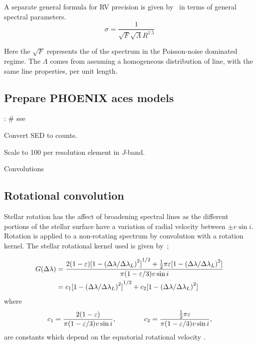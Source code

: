 A separate general formula for {RV} precision is given by~\citet{hatzes_spectrograph_1992} in terms of general spectral parameters.
\begin{equation}
\sigma = \frac{1}{\sqrt{F} \sqrt{\Lambda} {R}^{1.5}}
\end{equation}

Here the $\sqrt{F}$ represents the \snr{} of the spectrum in the {Poisson}-noise dominated regime.
The $\Lambda$ comes from assuming a homogeneous distribution of line, with the same line properties, per unit length.



\subsection{Prepare {PHOENIX} aces models}:
\# see~\citet{figueira_radial_2016}

Convert SED to counts.


Scale to 100 \snr{} per resolution element in \emph{J}-band.

Convolutions

\subsection{Rotational convolution}
\label{subsec:rotational_convolution}
Stellar rotation has the affect of broadening spectral lines as the different portions of the stellar surface have a variation of radial velocity between \(\pm v \sin i\).
Rotation is applied to a non-rotating spectrum by convolution with a rotation kernel.
The stellar rotational kernel used is given by~\citet{gray_observation_2005};


\begin{align}
G(\Delta\lambda) &= \frac{2(1-\varepsilon){[1-{(\Delta\lambda /{\Delta\lambda}_{L})}^{2}]}^{1/2} +   \frac{1}{2}\pi\varepsilon[1-{(\Delta\lambda /{\Delta\lambda}_{L})}^{2}]}{\pi (1-\varepsilon/3) v\sin{i}}\\
      &= c_{1}{[1- {(\Delta\lambda /\Delta\lambda_{L})}^{2}]}^{1/2} + c_{2}[1-{(\Delta\lambda /\Delta\lambda_{L})}^{2}] \label{eqn:rotational_profile}
\end{align}
where
\begin{equation}
c_1 = \frac{2(1-\varepsilon)} {\pi (1-\varepsilon/3)v\sin{i}},  \hspace{4em} c_2 = \frac{\frac{1}{2}\pi\varepsilon} {\pi (1-\varepsilon/3)v\sin{i}},
\end{equation}
are constants which depend on the equatorial rotational velocity \Vsini{}.

